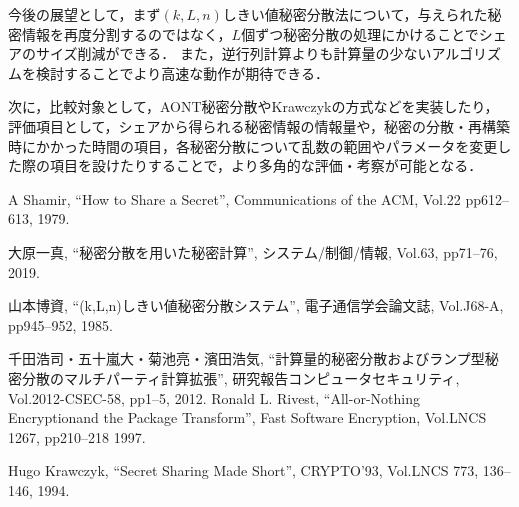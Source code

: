\documentclass[twocolumn]{jarticle}
\begin{document}
今後の展望として，まず$(k,L,n)$しきい値秘密分散法について，与えられた秘密情報を再度分割するのではなく，$L$個ずつ秘密分散の処理にかけることでシェアのサイズ削減ができる．
%
また，逆行列計算よりも計算量の少ないアルゴリズムを検討することでより高速な動作が期待できる．

次に，比較対象として，AONT秘密分散\cite{rivest}やKrawczykの方式\cite{krawczyk}などを実装したり，評価項目として，シェアから得られる秘密情報の情報量や，秘密の分散・再構築時にかかった時間の項目，各秘密分散について乱数の範囲やパラメータを変更した際の項目を設けたりすることで，より多角的な評価・考察が可能となる．


\vspace{6mm}
\begin{thebibliography}{9}
	\renewcommand{\baselinestretch}{1.0}
	\small
		A Shamir,
		``How to Share a Secret'',
		Communications of the ACM, Vol.22 pp612--613, 1979.

		大原一真,
		``秘密分散を用いた秘密計算'',
		システム/制御/情報, Vol.63, pp71--76, 2019.

		山本博資,
		``(k,L,n)しきい値秘密分散システム'',
		電子通信学会論文誌, Vol.J68-A, pp945--952, 1985.

		千田浩司・五十嵐大・菊池亮・濱田浩気,
		``計算量的秘密分散およびランプ型秘密分散のマルチパーティ計算拡張'',
		研究報告コンピュータセキュリティ, Vol.2012-CSEC-58, pp1--5, 2012.
		Ronald L. Rivest,
		``All-or-Nothing Encryptionand the Package Transform'',
		Fast Software Encryption, Vol.LNCS 1267, pp210--218 1997.

		Hugo Krawczyk,
		``Secret Sharing Made Short'',
		CRYPTO'93, Vol.LNCS 773, 136--146, 1994.
\end{thebibliography}
\end{document}
